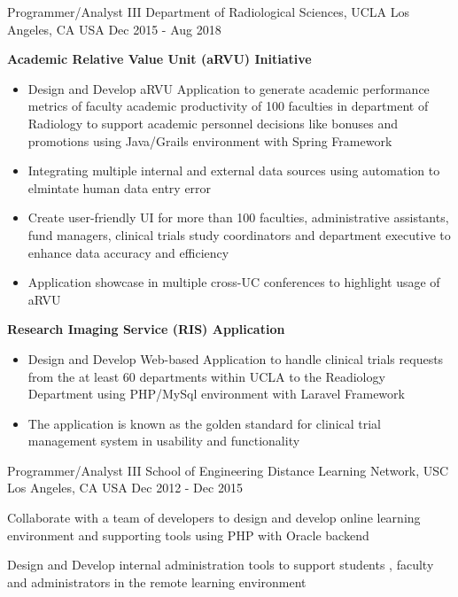 \begin{cventries}
  \cventry
    {Programmer/Analyst III} %
    {Department of Radiological Sciences, UCLA} %
    {Los Angeles, CA USA} %
    {Dec 2015 - Aug 2018} %
    {
       \begin{cvitems} %
        \item[] { {\bf Academic Relative Value Unit (aRVU) Initiative} 
            \begin{itemize} %
                \item {Design and Develop aRVU Application to generate academic performance metrics of faculty academic productivity of 100 faculties in department of Radiology to support academic personnel decisions like bonuses and promotions using Java/Grails environment with Spring Framework}
                \item {Integrating multiple internal and external data sources using automation to elmintate human data entry error}
                \item {Create user-friendly UI for more than 100 faculties, administrative assistants, fund managers, clinical trials study coordinators and department executive to enhance data accuracy and efficiency}
                \item {Application showcase in multiple cross-UC conferences to highlight usage of aRVU}
              \end{itemize}}
        \item[] {  {\bf Research Imaging Service (RIS) Application}  
            \begin{itemize} %
                \item {Design and Develop Web-based Application to handle clinical trials requests from the at least 60 departments within UCLA to the Readiology Department using PHP/MySql environment with Laravel Framework}
                \item {The application is known as the golden standard for clinical trial management system in usability and functionality}
              \end{itemize}}
      \end{cvitems}
    }
	
  \cventry
    {Programmer/Analyst III} %
    {School of Engineering Distance Learning Network, USC} %
    {Los Angeles, CA USA} %
    {Dec 2012 - Dec 2015} %
    {
      \begin{cvitems} %
        \item {Collaborate with a team of developers to design and develop online learning environment and supporting tools using PHP with Oracle backend}
        \item {Design and Develop internal administration tools to support students , faculty and administrators  in the remote learning environment}       
      \end{cvitems}
    }


\end{cventries}
